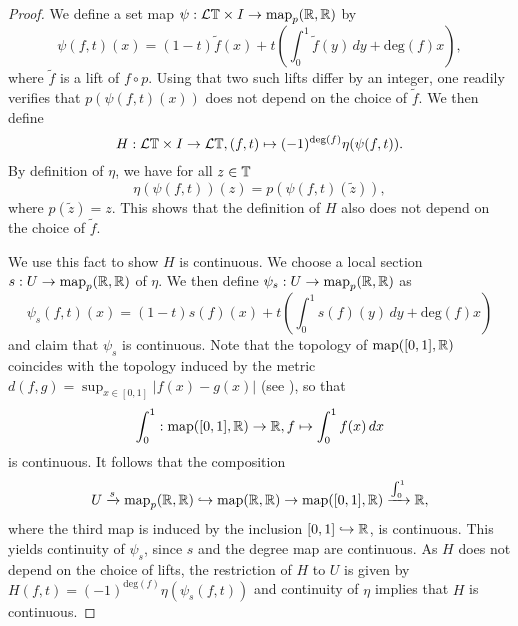 \begin{proof}
We define a set map $\psi:\mathcal{L}\mathbb{T}\times I\to \mathrm{map}_p(\mathbb{R},\mathbb{R})$
by
\begin{equation}\label{eq:loopspacelift}
\psi(f,t)(x) = (1-t)\tilde f(x) + t\left(\int_0^1 \tilde f(y)\,dy + \mathrm{deg}(f)x\right),
\end{equation}
where $\tilde f$ is a lift of $f\circ p$.
Using that two such lifts differ by an integer, one readily verifies that
$p(\psi(f,t)(x))$ does not depend on the choice of $\tilde f$.
We then define
\begin{equation}
H:\mathcal{L}\mathbb{T}\times I\to \mathcal{L}\mathbb{T}, (f,t)\mapsto (-1)^{\mathrm{deg}(f)}\eta(\psi(f,t)).
\end{equation}
By definition of $\eta$, we have for all $z\in \mathbb{T}$
\begin{equation}\label{eq:loopspacedeformationretraction}
\eta(\psi(f,t))(z) = p(\psi(f,t)(\tilde z)),
\end{equation}
where $p(\tilde z) = z$. This shows that the definition of $H$ also does not
depend on the choice of $\tilde f$.

We use this fact to show $H$ is continuous. We choose a local section
$s:U\to \mathrm{map}_p(\mathbb{R},\mathbb{R})$ of $\eta$. We then define
$\psi_s:U\to \mathrm{map}_p(\mathbb{R},\mathbb{R})$ as
\begin{equation}
\psi_s(f,t)(x) = (1-t) s(f)(x) + t\left(\int_0^1  s(f)(y)\,dy + \mathrm{deg}(f)x\right)
\end{equation}
and claim that $\psi_s$ is continuous. 
Note that the 
topology of $\mathrm{map}([0,1], \mathbb{R})$ coincides with the topology induced
by the metric $d(f,g) = \sup_{x\in [0,1]} |f(x) - g(x)|$ 
(see \cite[Proposition~2.13, \pno~5]{stricklandcgwh}),
so that
$$\int_0^1: \mathrm{map}([0,1], \mathbb{R})\to \mathbb{R}, f\mapsto \int_0^1 f(x) \, dx$$
is continuous.
It follows that the composition
\[
U\xrightarrow{s} \mathrm{map}_p(\mathbb{R},\mathbb{R})\hookrightarrow
\mathrm{map}(\mathbb{R},\mathbb{R})\to \mathrm{map}([0,1], \mathbb{R})\xrightarrow{\int_0^1}\mathbb{R},
\]
where the third map is induced by the inclusion $[0,1]\hookrightarrow \mathbb{R}$,
is continuous. This yields continuity of $\psi_s$, since $s$ and
the degree map are continuous. As $H$ does not
depend on the choice of lifts, the restriction of $H$
to $U$ is given by $H(f,t) = (-1)^{\mathrm{deg}(f)}\eta(\psi_s(f,t))$
and continuity of $\eta$ implies that $H$ is continuous.


\end{proof}
